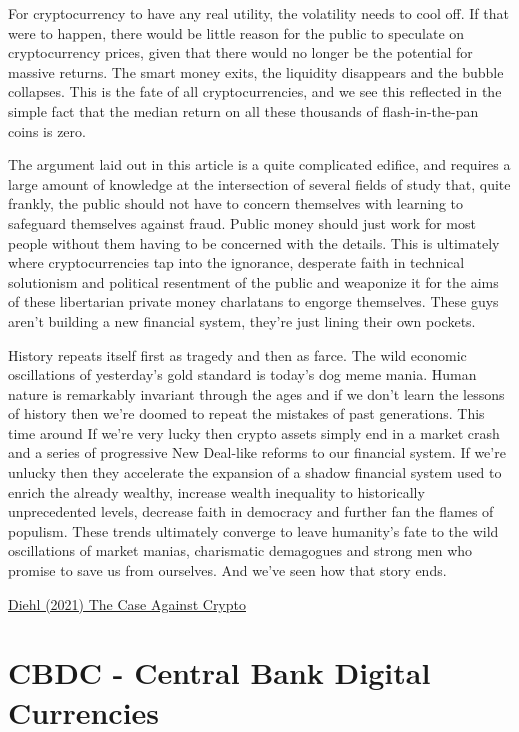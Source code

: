 \documentclass[
]{book}
\begin{document}
For cryptocurrency to have any real utility, the volatility needs to cool off. If that were to happen, there would be little reason for the public to speculate on cryptocurrency prices, given that there would no longer be the potential for massive returns. The smart money exits, the liquidity disappears and the bubble collapses. This is the fate of all cryptocurrencies, and we see this reflected in the simple fact that the median return on all these thousands of flash-in-the-pan coins is zero.

The argument laid out in this article is a quite complicated edifice, and requires a large amount of knowledge at the intersection of several fields of study that, quite frankly, the public should not have to concern themselves with learning to safeguard themselves against fraud. Public money should just work for most people without them having to be concerned with the details. This is ultimately where cryptocurrencies tap into the ignorance, desperate faith in technical solutionism and political resentment of the public and weaponize it for the aims of these libertarian private money charlatans to engorge themselves. These guys aren't building a new financial system, they're just lining their own pockets.

History repeats itself first as tragedy and then as farce. The wild economic oscillations of yesterday's gold standard is today's dog meme mania. Human nature is remarkably invariant through the ages and if we don't learn the lessons of history then we're doomed to repeat the mistakes of past generations. This time around If we're very lucky then crypto assets simply end in a market crash and a series of progressive New Deal-like reforms to our financial system. If we're unlucky then they accelerate the expansion of a shadow financial system used to enrich the already wealthy, increase wealth inequality to historically unprecedented levels, decrease faith in democracy and further fan the flames of populism. These trends ultimately converge to leave humanity's fate to the wild oscillations of market manias, charismatic demagogues and strong men who promise to save us from ourselves. And we've seen how that story ends.

\href{https://www.stephendiehl.com/blog/against-crypto.html}{Diehl (2021) The Case Against Crypto}

\hypertarget{cbdc---central-bank-digital-currencies}{%
\section{CBDC - Central Bank Digital Currencies}\label{cbdc---central-bank-digital-currencies}}
\end{document}
